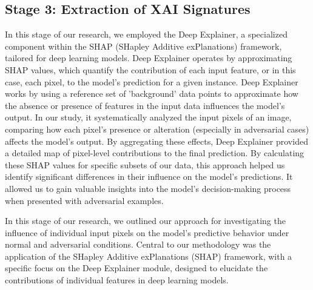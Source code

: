 \documentclass[10pt, conference, a4paper, final]{IEEEtran}
\begin{document}
\subsection{Stage 3: Extraction of XAI Signatures}

In this stage of our research, we employed the Deep Explainer, a specialized component within the SHAP (SHapley Additive exPlanations) framework, tailored for deep learning models. Deep Explainer operates by approximating SHAP values, which quantify the contribution of each input feature, or in this case, each pixel, to the model's prediction for a given instance. Deep Explainer works by using a reference set of 'background' data points to approximate how the absence or presence of features in the input data influences the model’s output. In our study, it systematically analyzed the input pixels of an image, comparing how each pixel's presence or alteration (especially in adversarial cases) affects the model's output. By aggregating these effects, Deep Explainer provided a detailed map of pixel-level contributions to the final prediction. By calculating these SHAP values for specific subsets of our data, this approach helped us identify significant differences in their influence on the model's predictions. It allowed us to gain valuable insights into the model's decision-making process when presented with adversarial examples.

In this stage of our research, we outlined our approach for investigating the influence of individual input pixels on the model's predictive behavior under normal and adversarial conditions. Central to our methodology was the application of the SHapley Additive exPlanations (SHAP) framework, with a specific focus on the Deep Explainer module, designed to elucidate the contributions of individual features in deep learning models.
\end{document}
